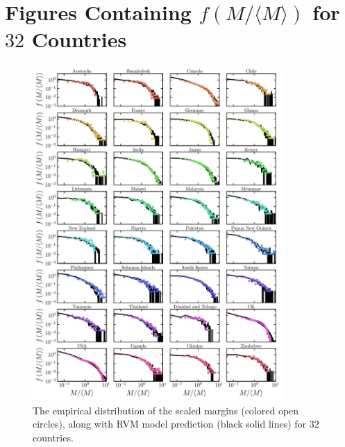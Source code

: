 \documentclass[reprint,aps,prl,showpacs,twocolumn, superscriptaddress]{revtex4-2}
\begin{document}
\section{Figures Containing $f\left(M / \langle M\rangle\right)$ for $32$ Countries}
\begin{figure}[h!]
    \includegraphics[width=0.85\textwidth]{fig_4_supp.pdf}
    \caption{The empirical distribution of the scaled margins (colored open circles), along with RVM model prediction (black solid lines) for $32$ countries.}
    \label{fig_sup_4}
\end{figure}
\newpage
\end{document}
